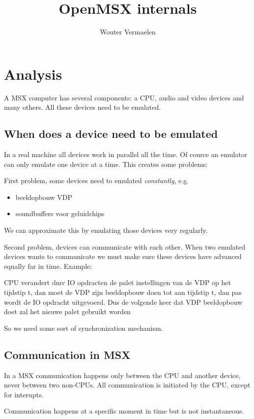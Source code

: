\documentclass[11pt, a4paper]{report}
\title{OpenMSX internals}
\author{Wouter Vermaelen}
\begin{document}
\maketitle

\chapter{Analysis}

A MSX computer has several components: a CPU, audio and video devices and
many others. All these devices need to be emulated.

\section{When does a device need to be emulated}

In a real machine all devices work in parallel all the time. Of cource an
emulator can only emulate one device at a time. This creates some problems:

First problem, some devices need to emulated \textit{constantly}, e.g.
\begin{itemize}
\item beeldopbouw VDP
\item soundbuffers voor geluidchips
\end{itemize}
We can approximate this by emulating those devices very regularly.

Second problem, devices can communicate with each other. When two emulated
devices wants to communicate we must make sure these devices have advanced
equally far in time. Example:

CPU verandert dmv IO opdracten de palet instellingen van de VDP op het 
tijdstip t, dan moet de VDP zijn beeldopbouw doen tot aan tijdstip t, dan
pas wordt de IO opdracht uitgevoerd. Dus de volgende keer dat VDP 
beeldopbouw doet zal het nieuwe palet gebruikt worden

So we need some sort of synchronization mechanism.


\section{Communication in MSX}

In a MSX communication happens only between the CPU and another device, never
between two non-CPUs. All communication is initiated by the CPU, except for
interupts.

Communication happens at a specific moment in time but is not instantaneous.
\end{document}
